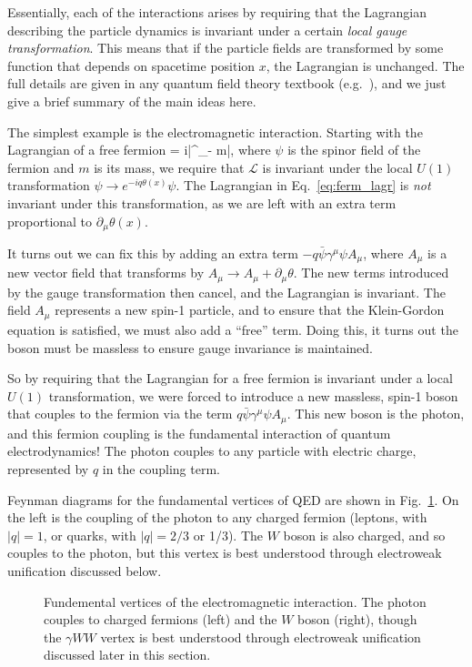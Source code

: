 Essentially, each of the interactions arises by requiring that the Lagrangian describing the particle dynamics is
invariant under a certain \textit{local gauge transformation}. This means that if the particle fields are transformed
by some function that depends on spacetime position $x$, the Lagrangian is unchanged.
The full details are given in any quantum field theory textbook (e.g.~\cite{Peskin}), and we just give a brief
summary of the main ideas here.

The simplest example is the electromagnetic interaction. Starting with the Lagrangian of a free fermion
\be\label{eq:ferm_lagr}
 = i\bar{\psi}\gamma^\mu\partial_\mu\psi - m\bar{\psi}\psi,
\ee
where $\psi$ is the spinor field of the fermion and $m$ is its mass,
we require that $\mathcal{L}$ is invariant under the local $U(1)$ transformation $\psi\to e^{-iq\theta(x)}\psi$.
The Lagrangian in Eq.~\ref{eq:ferm_lagr} is \textit{not} invariant under this transformation,
as we are left with an extra term proportional to $\partial_\mu\theta(x)$.

It turns out we can fix this by adding an extra term $-q\bar{\psi}\gamma^\mu\psi A_\mu$, where
$A_\mu$ is a new vector field that transforms by $A_\mu\to A_\mu+\partial_\mu\theta$. The new terms
introduced by the gauge transformation then cancel, and the Lagrangian is invariant.  The field
$A_\mu$ represents a new spin-1 particle, and to ensure that the Klein-Gordon equation is satisfied,
we must also add a ``free'' term. Doing this, it turns out the boson must be massless to ensure gauge invariance is
maintained.

So by requiring that the Lagrangian for a free fermion is invariant under a local $U(1)$ transformation,
we were forced to introduce a new massless, spin-1 boson that couples to the fermion via the term
$q\bar{\psi}\gamma^\mu\psi A_\mu$. This new boson is the photon, and this fermion coupling
is the fundamental interaction of quantum electrodynamics! The photon couples to any particle with
electric charge, represented by $q$ in the coupling term.

Feynman diagrams for the fundamental vertices of QED are shown in Fig.~\ref{fig:em_diagrams}.
On the left is the coupling of the photon to any charged fermion (leptons, with $|q|=1$, or
quarks, with $|q|=2/3$ or 1/3). The $W$ boson is also charged, and so couples to the photon,
but this vertex is best understood through electroweak unification discussed below.


\begin{figure}[ht]
  \addtolength{\abovecaptionskip}{5mm}
  \centering
  \vskip5mm
  
  
  \caption{Fundemental vertices of the electromagnetic interaction. The photon couples to charged fermions (left)
    and the $W$ boson (right), though the $\gamma WW$ vertex is best understood through electroweak
    unification discussed later in this section.
  }
  \label{fig:em_diagrams}
\end{figure}

